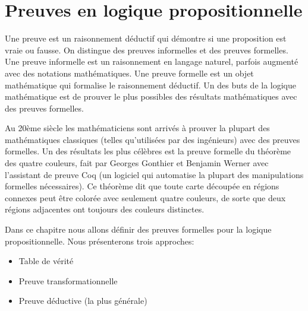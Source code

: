 % 			
% 				
% 	
	\chapter{Preuves en logique propositionnelle}
\label{preuveprop}
		Une preuve est un raisonnement déductif qui démontre si une proposition
est vraie ou fausse.
On distingue des preuves informelles et des preuves formelles.
Une preuve informelle est un raisonnement en langage naturel, parfois augmenté avec des
notations mathématiques.
Une preuve formelle est un objet mathématique qui formalise le raisonnement déductif.
Un des buts de la logique mathématique est de prouver le plus possibles des résultats
mathématiques avec des preuves formelles.

Au 20ème siècle les mathématiciens sont arrivés à prouver la plupart des mathématiques
classiques (telles qu'utilisées par des ingénieurs) avec des preuves formelles.
Un des résultats les plus célèbres est la preuve formelle du théorème des quatre couleurs,
fait par Georges Gonthier et Benjamin Werner avec l'assistant de preuve Coq (un logiciel
qui automatise la plupart des manipulations formelles nécessaires).
Ce théorème dit que toute carte découpée en régions connexes peut être colorée avec seulement
quatre couleurs, de sorte que deux régions adjacentes ont toujours des couleurs distinctes.

Dans ce chapitre nous allons définir des preuves formelles pour la logique propositionnelle.
Nous présenterons trois approches:
		\begin{itemize}
			\item Table de vérité
			\item Preuve transformationnelle
			\item Preuve déductive (la plus générale)		
		\end{itemize}

